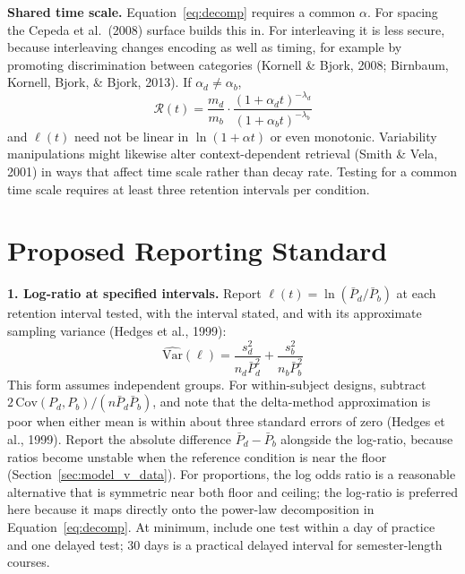 \documentclass[10pt,twocolumn]{article}
\newcommand{\effr}{\mathcal{R}}
\newcommand{\lr}{\ell}
\begin{document}
\textbf{Shared time scale.} Equation~\ref{eq:decomp} requires a common $\alpha$. For spacing the Cepeda et al.\ (2008) surface builds this in. For interleaving it is less secure, because interleaving changes encoding as well as timing, for example by promoting discrimination between categories (Kornell \& Bjork, 2008; Birnbaum, Kornell, Bjork, \& Bjork, 2013). If $\alpha_d \neq \alpha_b$,
\begin{equation}
\effr(t) = \frac{m_d}{m_b} \cdot \frac{(1 + \alpha_d t)^{-\lambda_d}}{(1 + \alpha_b t)^{-\lambda_b}}
\label{eq:ratio_full}
\end{equation}
and $\lr(t)$ need not be linear in $\ln(1+\alpha t)$ or even monotonic. Variability manipulations might likewise alter context-dependent retrieval (Smith \& Vela, 2001) in ways that affect time scale rather than decay rate. Testing for a common time scale requires at least three retention intervals per condition.

\section{Proposed Reporting Standard}
\label{sec:standard}

\textbf{1. Log-ratio at specified intervals.} Report $\lr(t) = \ln(\bar{P}_d/\bar{P}_b)$ at each retention interval tested, with the interval stated, and with its approximate sampling variance (Hedges et al., 1999):
\begin{equation}
\widehat{\text{Var}}(\lr) = \frac{s_d^2}{n_d \bar{P}_d^2} + \frac{s_b^2}{n_b \bar{P}_b^2}
\label{eq:var_lnrr}
\end{equation}
This form assumes independent groups. For within-subject designs, subtract $2\,\text{Cov}(P_d, P_b)/(n\bar{P}_d\bar{P}_b)$, and note that the delta-method approximation is poor when either mean is within about three standard errors of zero (Hedges et al., 1999). Report the absolute difference $\bar{P}_d - \bar{P}_b$ alongside the log-ratio, because ratios become unstable when the reference condition is near the floor (Section~\ref{sec:model_v_data}). For proportions, the log odds ratio is a reasonable alternative that is symmetric near both floor and ceiling; the log-ratio is preferred here because it maps directly onto the power-law decomposition in Equation~\ref{eq:decomp}. At minimum, include one test within a day of practice and one delayed test; 30 days is a practical delayed interval for semester-length courses.
\end{document}
